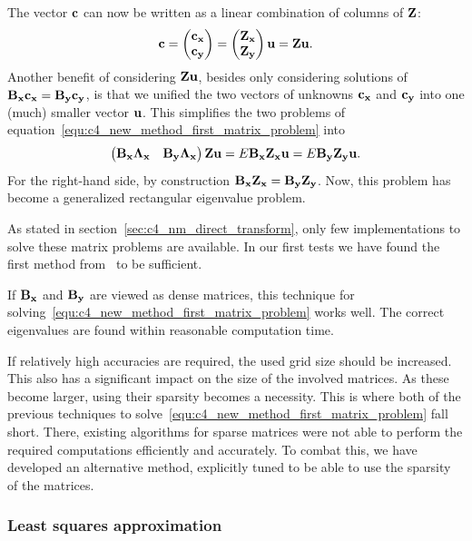 The vector $\vb{c}$ can now be written as a linear combination of columns of $\vb{Z}$:
$$
    \vb{c} = \begin{pmatrix}\vb{c_x} \\ \vb{c_y} \end{pmatrix} = \begin{pmatrix} \vb{Z_x} \\ \vb{Z_y} \end{pmatrix}  \vb{u} = \vb{Z} \vb{u} \text{.}
$$
Another benefit of considering $\vb{Z}\vb{u}$, besides only considering solutions of $\vb{B_x} \vb{c_x} = \vb{B_y} \vb{c_y}$, is that we unified the two vectors of unknowns $\vb{c_x}$ and $\vb{c_y}$ into one (much) smaller vector $\vb{u}$. This simplifies the two problems of equation~\eqref{equ:c4_new_method_first_matrix_problem} into
$$
    \begin{pmatrix}
        \vb{B_x}\vb{\Lambda_x} & \vb{B_y}\vb{\Lambda_x}
    \end{pmatrix} \vb{Z} \vb{u} = E \vb{B_x} \vb{Z_x} \vb{u} = E \vb{B_y} \vb{Z_y} \vb{u} \text{.}
$$
For the right-hand side, by construction $\vb{B_x} \vb{Z_x} = \vb{B_y} \vb{Z_y}$. Now, this problem has become a generalized rectangular eigenvalue problem.

As stated in section~\ref{sec:c4_nm_direct_transform}, only few implementations to solve these matrix problems are available. In our first tests we have found the first method from~\cite{hua_svd_1991} to be sufficient.

If $\vb{B_x}$ and $\vb{B_y}$ are viewed as dense matrices, this technique for solving~\eqref{equ:c4_new_method_first_matrix_problem} works well. The correct eigenvalues are found within reasonable computation time.

If relatively high accuracies are required, the used grid size should be increased. This also has a significant impact on the size of the involved matrices. As these become larger, using their sparsity becomes a necessity. This is where both of the previous techniques to solve~\eqref{equ:c4_new_method_first_matrix_problem} fall short. There, existing algorithms for sparse matrices were not able to perform the required computations efficiently and accurately. To combat this, we have developed an alternative method, explicitly tuned to be able to use the sparsity of the matrices.

\subsubsection{Least squares approximation}\label{sec:c4_matrix_least_squares}

